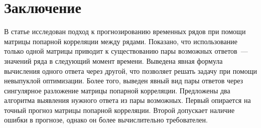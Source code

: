 \documentclass{article}
\begin{document}
\section{Заключение}

В статье исследован подход к прогнозированию временных рядов при помощи матрицы попарной корреляции между рядами. Показано, что использование только одной матрицы приводит к существованию пары возможных ответов~--- значений ряда в следующий момент времени. Выведена явная формула вычисления одного ответа через другой, что позволяет решать задачу при помощи невыпуклой оптимизации. Более того, выведен явный вид пары ответов через сингулярное разложение матрицы попарной корреляции. Предложены два алгоритма выявления нужного ответа из пары возможных. Первый опирается на точный прогноз матрицы попарной корреляции. Второй допускает наличие ошибки в прогнозе, однако он более вычислительно требователен.



\end{document}
